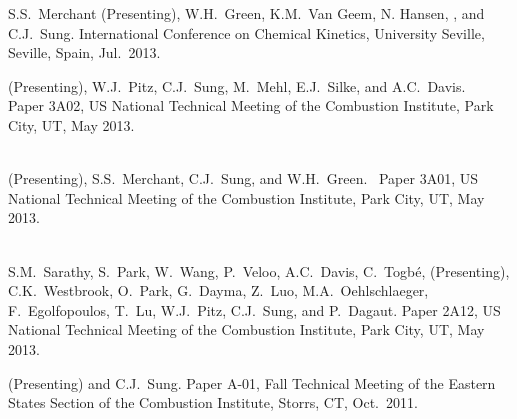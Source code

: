 \begin{bibmune}
    \item S.S.\ Merchant (Presenting), W.H.\ Green, K.M.\ Van Geem, N.
    Hansen, , and C.J.\ Sung.
      International
    Conference on Chemical Kinetics, University Seville, Seville,
    Spain, Jul.\ 2013.

    \item {} (Presenting), W.J.\ Pitz, C.J.\ Sung, M.\ Mehl,
    E.J.\ Silke, and A.C.\ Davis.\ 
    Paper 3A02,  US National Technical Meeting of the
    Combustion Institute, Park City, UT, May 2013.\\
    \\

    \item {} (Presenting), S.S.\ Merchant, C.J.\ Sung, and
    W.H.\ Green.\  Paper 3A01,  US National
    Technical Meeting of the Combustion Institute, Park City, UT, May
    2013.\\
    \\

    \item S.M.\ Sarathy, S.\ Park, W.\ Wang, P.\ Veloo, A.C.\ Davis, C.\ Togbé,
     (Presenting), C.K.\ Westbrook, O.\ Park,
    G.\ Dayma, Z.\ Luo, M.A.\ Oehlschlaeger, F.\ Egolfopoulos, T.\ Lu,
    W.J.\ Pitz, C.J.\ Sung, and P.\ Dagaut. 
    Paper 2A12,  US National Technical Meeting of the
    Combustion Institute, Park City, UT, May 2013.

    \item {} (Presenting) and C.J.\ Sung.
     Paper A-01, Fall Technical Meeting of the
    Eastern States Section of the Combustion Institute, Storrs, CT, Oct.\
    2011.\\
    \\


\end{bibmune}
